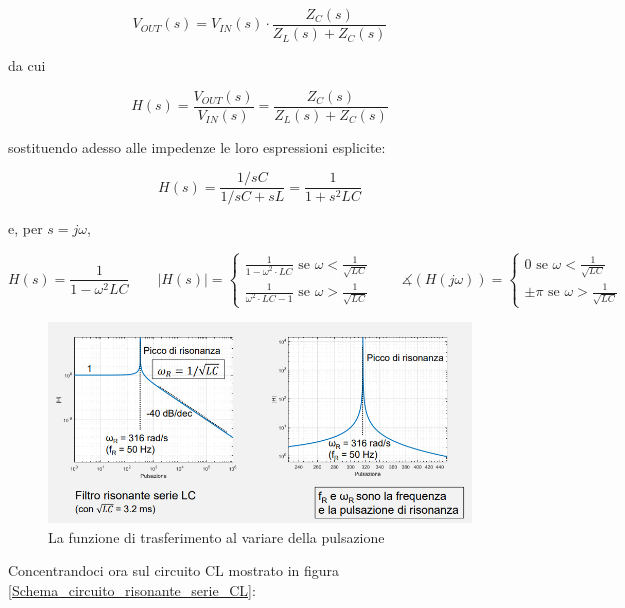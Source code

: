 \documentclass{article}
\begin{document}
\[V_{OUT}(s) = V_{IN}(s) \cdot \frac{Z_C(s)}{Z_L(s) + Z_C(s)}\]

da cui

\[H(s) = \frac{V_{OUT} (s)}{V_{IN} (s)} = \frac{Z_C(s)}{Z_L(s) + Z_C(s)}\]

sostituendo adesso alle impedenze le loro espressioni esplicite:

\[H(s) = \frac{1/sC}{1/sC + sL} = \frac{1}{1 + s^2 LC}\]

e, per $s = j\omega$, 

\[H(s) = \frac{1}{1 - \omega ^2 LC} \quad \quad |H(s)| = \begin{cases} \frac{1}{1 - \omega ^2 \cdot LC} \textrm{ se } \omega < \frac{1}{\sqrt{LC}} \\ \frac{1}{\omega ^2 \cdot LC - 1} \textrm{ se } \omega > \frac{1}{\sqrt{LC}} \end{cases} \quad \quad \measuredangle (H(j \omega)) = \begin{cases} 0 \textrm{ se } \omega < \frac{1}{\sqrt{LC}} \\ \pm \pi \textrm{ se } \omega > \frac{1}{\sqrt{LC}} \end{cases}\]

\begin{figure}[h]
  \centering
  \includegraphics[scale=0.55]{IM_circuito_risonante_serie_LC_grafici}
  \caption{La funzione di trasferimento al variare della pulsazione}
  \label{Schema_circuito_risonante_serie_LC_grafici}
\end{figure}

\clearpage
Concentrandoci ora sul circuito CL mostrato in figura \ref{Schema_circuito_risonante_serie_CL}:
\end{document}

